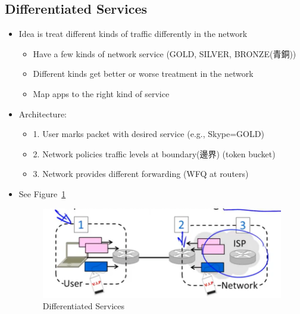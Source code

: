 \documentclass[12pt]{ctexart}   %
\begin{document}
	\subsection{Differentiated Services}
	\begin{itemize}
		\item Idea is treat different kinds of traffic differently in the network
		\begin{itemize}
			\item Have a few kinds of network service (GOLD, SILVER, BRONZE(青銅))
			\item Different kinds get better or worse treatment in the network
			\item Map apps to the right kind of service
		\end{itemize}

		\item Architecture:
		\begin{itemize}
			\item {\color{blue} 1.} User marks packet with desired service (e.g., Skype=GOLD)
			\item {\color{blue} 2.} Network policies traffic levels at boundary(邊界) (token bucket)
			\item {\color{blue} 3.} Network provides different forwarding (WFQ at routers)
		\end{itemize}
		\item See Figure~\ref{fig:9-6-3}
		  
		\begin{figure}[h!] %
		\centering
		\includegraphics[scale=0.7]{images/9-6-3}
		\caption{ Differentiated Services }
		\label{fig:9-6-3}
		\end{figure}
	\end{itemize}
\end{document}

